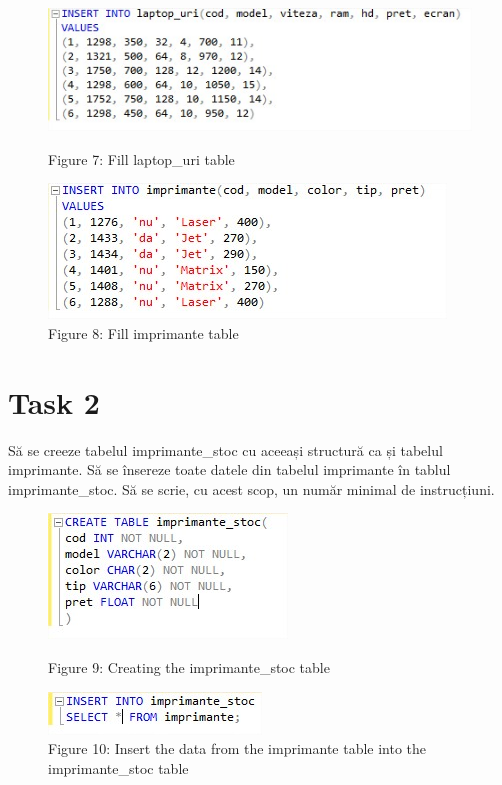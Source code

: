 \begin{figure}[H]
	\centering
		\includegraphics[width=\linewidth]{screens/7.jpg}
		\caption*{Figure 7: Fill laptop\_uri table}
		\label{}
	\endminipage\hfill
		\includegraphics[width=\linewidth]{screens/8.jpg}
		\caption*{Figure 8: Fill imprimante table}
	\endminipage
\end{figure}



\section{Task 2}
Să se creeze tabelul imprimante\_stoc cu aceeași structură ca și tabelul imprimante. Să se însereze toate datele din tabelul imprimante în tablul imprimante\_stoc. Să se scrie, cu acest scop, un număr minimal de instrucțiuni. 

\begin{figure}[H]
	\centering
		\includegraphics[width=\linewidth]{screens/9.jpg}
		\caption*{Figure 9: Creating the imprimante\_stoc table}
		\label{}
	\endminipage\hfill
		\includegraphics[width=\linewidth]{screens/10.jpg}
		\caption*{Figure 10: Insert the data from the imprimante table into the imprimante\_stoc table}
	\endminipage
\end{figure}
	

